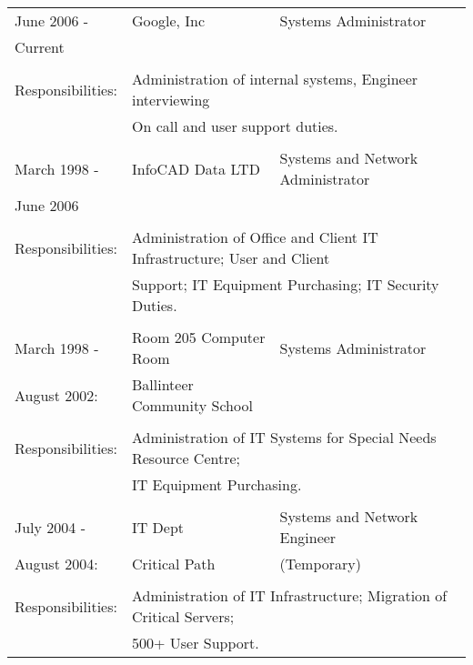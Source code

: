 \documentclass[a4paper, 11pt] {article}
\begin{document}
\begin{tabular}{llll}
June 2006 - 		&	Google, Inc	&	 Systems Administrator						&	\hspace{10mm}	\\
Current  			&			&              &            			\\
      				&			&              &            			\\
Responsibilities:	& \multicolumn{3}{l}{Administration of internal systems, Engineer interviewing} 	\\
						& \multicolumn{3}{l}{On call and user support duties.} 	\\
      				&              						&  &	\\
March 1998 - 		&	InfoCAD Data LTD	& Systems and Network Administrator	&	\hspace{10mm}	\\
June 2006  			&			&              &            			\\
      				&			&              &            			\\
Responsibilities:	& \multicolumn{3}{l}{Administration of Office and Client IT Infrastructure; User and Client} 	\\
						& \multicolumn{3}{l}{Support; IT Equipment Purchasing; IT Security Duties.} 	\\
      				&              						&  &	\\
March 1998 -		& 	Room 205 Computer Room			&	Systems Administrator	& \hspace{10mm}	\\
August 2002:		&  Ballinteer Community School	&	&	\\
						& 		&	\\
Responsibilities:	& \multicolumn{3}{l}{Administration of IT Systems for Special Needs Resource Centre;} 	\\
						& \multicolumn{3}{l}{IT Equipment Purchasing.} 	\\
						& 											&	&	\\
July 2004 -			& IT Dept								&	Systems and Network Engineer	& \hspace{10mm}\\
August 2004:		& Critical Path						& (Temporary)	&	\\
						& 											&	&	\\
Responsibilities:	& \multicolumn{3}{l}{Administration of IT Infrastructure; Migration of Critical Servers;}	\\ 
						& \multicolumn{3}{l}{500+ User Support.} 	\\

\end{tabular}
\end{document}

